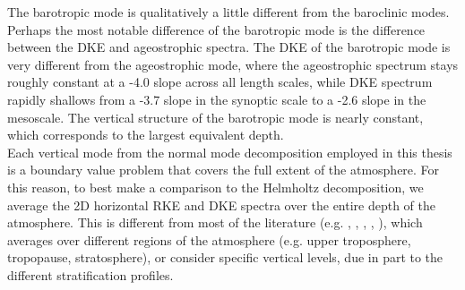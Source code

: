 The barotropic mode is qualitatively a little different from the baroclinic modes. Perhaps the most notable difference of the barotropic mode is the difference between the DKE and ageostrophic spectra. The DKE of the barotropic mode is very different from the ageostrophic mode, where the ageostrophic spectrum stays roughly constant at a -4.0 slope across all length scales, while  DKE spectrum rapidly shallows from a -3.7 slope in the synoptic scale to a -2.6 slope in the mesoscale. The vertical structure of the barotropic mode is nearly constant, which corresponds to the largest equivalent depth.  \\

Each vertical mode from the normal mode decomposition employed in this thesis is a boundary value problem that covers the full extent of the atmosphere. For this reason, to best make a comparison to the Helmholtz decomposition, we average the 2D horizontal RKE and DKE spectra over the entire depth of the atmosphere. This is different from most of the literature (e.g. \cite{Hamilton2008}, \cite{Skamarock2008a}, \cite{Waite2009}, \cite{Peng2013}, \cite{Waite2013}), which averages over different regions of the atmosphere (e.g. upper troposphere, tropopause, stratosphere), or consider specific vertical levels, due in part to the different stratification profiles. 

